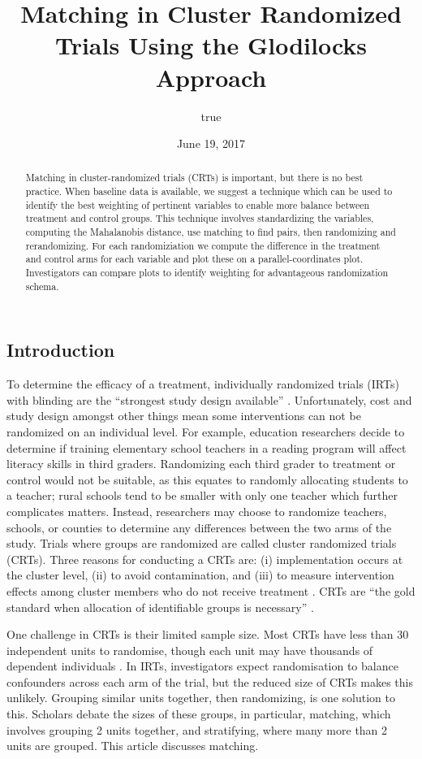 \documentclass[]{sagej}
\title{Matching in Cluster Randomized Trials Using the Glodilocks Approach}
\author{true}
\date{June 19, 2017}
\begin{document}
\maketitle
\begin{abstract}
Matching in cluster-randomized trials (CRTs) is important, but there is
no best practice. When baseline data is available, we suggest a
technique which can be used to identify the best weighting of pertinent
variables to enable more balance between treatment and control groups.
This technique involves standardizing the variables, computing the
Mahalanobis distance, use matching to find pairs, then randomizing and
rerandomizing. For each randomiziation we compute the difference in the
treatment and control arms for each variable and plot these on a
parallel-coordinates plot. Investigators can compare plots to identify
weighting for advantageous randomization schema.
\end{abstract}

\subsection{Introduction}\label{introduction}

To determine the efficacy of a treatment, individually randomized trials
(IRTs) with blinding are the ``strongest study design available''
\citep{gatsonis2017methods}. Unfortunately, cost and study design
amongst other things mean some interventions can not be randomized on an
individual level. For example, education researchers decide to determine
if training elementary school teachers in a reading program will affect
literacy skills in third graders. Randomizing each third grader to
treatment or control would not be suitable, as this equates to randomly
allocating students to a teacher; rural schools tend to be smaller with
only one teacher which further complicates matters. Instead, researchers
may choose to randomize teachers, schools, or counties to determine any
differences between the two arms of the study. Trials where groups are
randomized are called cluster randomized trials (CRTs). Three reasons
for conducting a CRTs are: (i) implementation occurs at the cluster
level, (ii) to avoid contamination, and (iii) to measure intervention
effects among cluster members who do not receive treatment
\citep{balzer2012match, CRTrials2009}. CRTs are ``the gold standard when
allocation of identifiable groups is necessary''
\citep{murray2004design}.

One challenge in CRTs is their limited sample size. Most CRTs have less
than 30 independent units to randomise, though each unit may have
thousands of dependent individuals \citep{balzer2012match}. In IRTs,
investigators expect randomisation to balance confounders across each
arm of the trial, but the reduced size of CRTs makes this unlikely.
Grouping similar units together, then randomizing, is one solution to
this. Scholars debate the sizes of these groups, in particular,
matching, which involves grouping 2 units together, and stratifying,
where many more than 2 units are grouped\citep{PMVsStrat}. This article
discusses matching.
\end{document}
